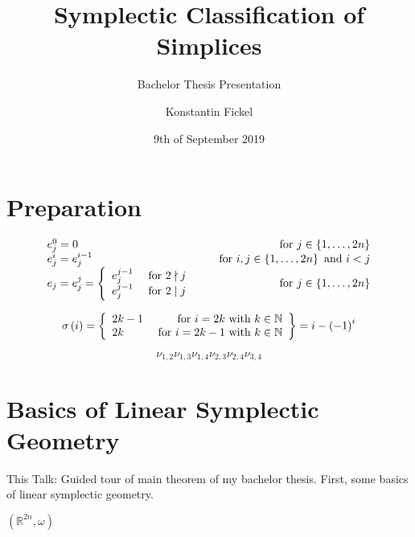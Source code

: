 \documentclass[12pt,a4paper]{scrartcl}
\title{Symplectic Classification of Simplices}
\subtitle{Bachelor Thesis Presentation}
\author{Konstantin Fickel}
\date{9th of September 2019}
\begin{document}
\maketitle{}

\begin{abstract}
  
\end{abstract}

\begingroup
\linenumbers
\modulolinenumbers[5]

\section{Preparation}

\[
  \begin{array}{llr}
    e_j^0 = 0 & & \textnormal{ for } j \in \left\lbrace 1, \dots, 2n \right\rbrace \\
    e_j^i = e_j^{i-1} & & \textnormal{ for } i,j \in \left\lbrace 1, \dots, 2n \right\rbrace \textnormal{ and } i < j\\
    e_j = e_j^j = \left\lbrace\begin{array}{lr}
        e_j^{j-1} & \textnormal{ for } 2 \nmid j \\
        e_j^{j-1} & \textnormal{ for } 2 \mid j
    \end{array}\right. & & \textnormal{ for } j \in \left\lbrace 1, \dots, 2n \right\rbrace
  \end{array}
\]

\[
  \sigma \left( i \right) = \left\lbrace \begin{array}{lr}
    2k-1 & \textnormal{ for } i = 2k \textnormal{ with } k \in \mathbb{N}\\
    2k & \textnormal{ for } i = 2k-1 \textnormal{ with } k \in \mathbb{N}\\
  \end{array} \right\rbrace = i - \left( -1 \right)^{i}
\]

\[
  \nu_{1,2} \nu_{1,3} \nu_{1,4} \nu_{2,3} \nu_{2,4} \nu_{3,4}
\]

\section{Basics of Linear Symplectic Geometry}

This Talk: Guided tour of main theorem of my bachelor thesis. First, some basics of linear symplectic geometry.

\( \left( \mathbb{R}^{2n}, \omega \right) \)
\end{document}
